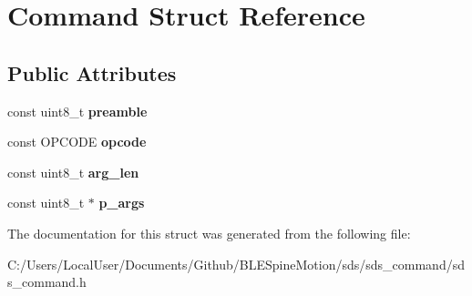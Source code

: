 \hypertarget{struct_command}{}\section{Command Struct Reference}
\label{struct_command}
\subsection*{Public Attributes}
\begin{DoxyCompactItemize}
\item 
\mbox{\label{struct_command_a168b4934534db355ac4ff81057a973b3}} 
const uint8\+\_\+t {\bfseries preamble}
\item 
\mbox{\label{struct_command_ac1619a739420058accd4012d374ccdc7}} 
const O\+P\+C\+O\+DE {\bfseries opcode}
\item 
\mbox{\label{struct_command_a06510ce9eed1a75d93d77abda312b68e}} 
const uint8\+\_\+t {\bfseries arg\+\_\+len}
\item 
\mbox{\label{struct_command_a5075dbae4009e489d9d298763c3dbfc3}} 
const uint8\+\_\+t $\ast$ {\bfseries p\+\_\+args}
\end{DoxyCompactItemize}


The documentation for this struct was generated from the following file\+:\begin{DoxyCompactItemize}
\item 
C\+:/\+Users/\+Local\+User/\+Documents/\+Github/\+B\+L\+E\+Spine\+Motion/sds/sds\+\_\+command/sds\+\_\+command.\+h\end{DoxyCompactItemize}
